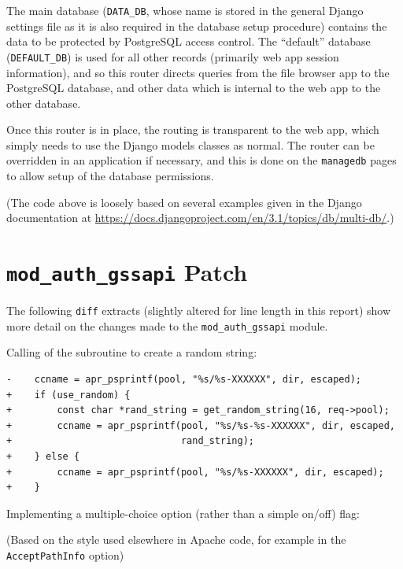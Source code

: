 \documentclass[12pt]{report}
\begin{document}
The main database (\verb+DATA_DB+, whose name is stored in the general Django settings file as it is also required in the database setup procedure) contains the data to be protected by PostgreSQL access control. The ``default'' database (\verb+DEFAULT_DB+) is used for all other records (primarily web app session information), and so this router directs queries from the file browser app to the PostgreSQL database, and other data which is internal to the web app to the other database.

Once this router is in place, the routing is transparent to the web app, which simply needs to use the Django models classes as normal. The router can be overridden in an application if necessary, and this is done on the \verb+managedb+ pages to allow setup of the database permissions.

(The code above is loosely based on several examples given in the Django documentation at \url{https://docs.djangoproject.com/en/3.1/topics/db/multi-db/}.)

\chapter{\texttt{mod\_auth\_gssapi} Patch}
\label{sec:appendix3}

The following \texttt{diff} extracts (slightly altered for line length in this report) show more detail on the changes made to the \verb+mod_auth_gssapi+ module.

Calling of the subroutine to create a random string:

\begin{verbatim}
-    ccname = apr_psprintf(pool, "%s/%s-XXXXXX", dir, escaped);
+    if (use_random) {
+        const char *rand_string = get_random_string(16, req->pool);
+        ccname = apr_psprintf(pool, "%s/%s-%s-XXXXXX", dir, escaped,
+                              rand_string);
+    } else {
+        ccname = apr_psprintf(pool, "%s/%s-XXXXXX", dir, escaped);
+    }
\end{verbatim}

Implementing a multiple-choice option (rather than a simple on/off) flag:

(Based on the style used elsewhere in Apache code, for example in the \texttt{AcceptPathInfo} option\cite{AcceptPathInfo-source})
\end{document}
